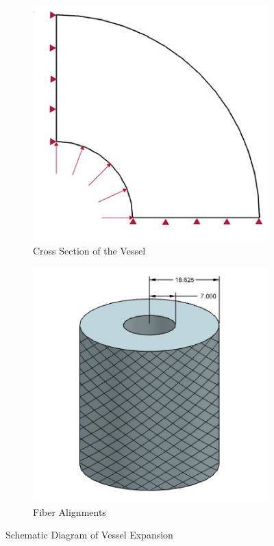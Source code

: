 \begin{figure}[H]
	\centering
	\begin{subfigure}[b]{0.4\textwidth}
		\centering
		\includegraphics[width=\textwidth]{./figures/vessel_schematic.jpg}
		\caption{Cross Section of the Vessel}
		\label{fig:vessel_schematic}
	\end{subfigure}
	\begin{subfigure}[b]{0.4\textwidth}
		\centering
		\includegraphics[width=\textwidth]{./figures/vessel_schematic2.png}
		\caption{Fiber Alignments}
		\label{fig:vessel_schematic2}
	\end{subfigure}
	\caption{Schematic Diagram of Vessel Expansion}
\end{figure}

